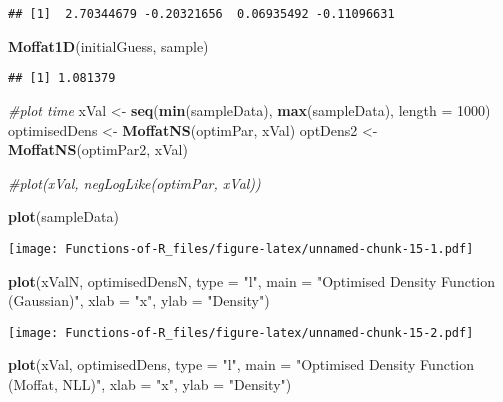 \documentclass[
]{article}
\newenvironment{Shaded}{\begin{snugshade}}{\end{snugshade}}
\newcommand{\AttributeTok}[1]{\textcolor[rgb]{0.13,0.29,0.53}{#1}}
\newcommand{\CommentTok}[1]{\textcolor[rgb]{0.56,0.35,0.01}{\textit{#1}}}
\newcommand{\DecValTok}[1]{\textcolor[rgb]{0.00,0.00,0.81}{#1}}
\newcommand{\FunctionTok}[1]{\textcolor[rgb]{0.13,0.29,0.53}{\textbf{#1}}}
\newcommand{\NormalTok}[1]{#1}
\newcommand{\OtherTok}[1]{\textcolor[rgb]{0.56,0.35,0.01}{#1}}
\newcommand{\StringTok}[1]{\textcolor[rgb]{0.31,0.60,0.02}{#1}}
\begin{document}
\begin{verbatim}
## [1]  2.70344679 -0.20321656  0.06935492 -0.11096631
\end{verbatim}

\begin{Shaded}
\begin{Highlighting}[]
\FunctionTok{Moffat1D}\NormalTok{(initialGuess, sample)}
\end{Highlighting}
\end{Shaded}

\begin{verbatim}
## [1] 1.081379
\end{verbatim}

\begin{Shaded}
\begin{Highlighting}[]
\CommentTok{\#plot time}
\NormalTok{xVal }\OtherTok{\textless{}{-}} \FunctionTok{seq}\NormalTok{(}\FunctionTok{min}\NormalTok{(sampleData), }\FunctionTok{max}\NormalTok{(sampleData), }\AttributeTok{length =} \DecValTok{1000}\NormalTok{)}
\NormalTok{optimisedDens }\OtherTok{\textless{}{-}} \FunctionTok{MoffatNS}\NormalTok{(optimPar, xVal)}
\NormalTok{optDens2 }\OtherTok{\textless{}{-}} \FunctionTok{MoffatNS}\NormalTok{(optimPar2, xVal)}

\CommentTok{\#plot(xVal, negLogLike(optimPar, xVal))}

\FunctionTok{plot}\NormalTok{(sampleData)}
\end{Highlighting}
\end{Shaded}

\texttt{[image: Functions-of-R\_files/figure-latex/unnamed-chunk-15-1.pdf]}

\begin{Shaded}
\begin{Highlighting}[]
\FunctionTok{plot}\NormalTok{(xValN, optimisedDensN, }\AttributeTok{type =} \StringTok{"l"}\NormalTok{, }\AttributeTok{main =} \StringTok{"Optimised Density Function (Gaussian)"}\NormalTok{, }\AttributeTok{xlab =} \StringTok{"x"}\NormalTok{, }\AttributeTok{ylab =} \StringTok{"Density"}\NormalTok{)}
\end{Highlighting}
\end{Shaded}

\texttt{[image: Functions-of-R\_files/figure-latex/unnamed-chunk-15-2.pdf]}

\begin{Shaded}
\begin{Highlighting}[]
\FunctionTok{plot}\NormalTok{(xVal, optimisedDens, }\AttributeTok{type =} \StringTok{"l"}\NormalTok{, }\AttributeTok{main =} \StringTok{"Optimised Density Function (Moffat, NLL)"}\NormalTok{, }\AttributeTok{xlab =} \StringTok{"x"}\NormalTok{, }\AttributeTok{ylab =} \StringTok{"Density"}\NormalTok{)}
\end{Highlighting}
\end{Shaded}
\end{document}
